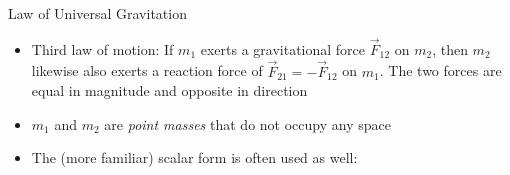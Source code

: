 \documentclass[12pt,compress,aspectratio=169]{beamer}
\begin{document}
\begin{frame}{Law of Universal Gravitation}
  \begin{center}
  \end{center}
  \begin{itemize}
  \item Third law of motion: If $m_1$ exerts a gravitational force $\vec F_{12}$
    on $m_2$, then $m_2$ likewise also exerts a reaction force of
    $\vec F_{21}=-\vec F_{12}$ on $m_1$. The two forces are equal in magnitude
    and opposite in direction
  \item $m_1$ and $m_2$ are \emph{point masses} that do not occupy any space
  \item The (more familiar) scalar form is often used as well:

  \end{itemize}
\end{frame}
\end{document}
